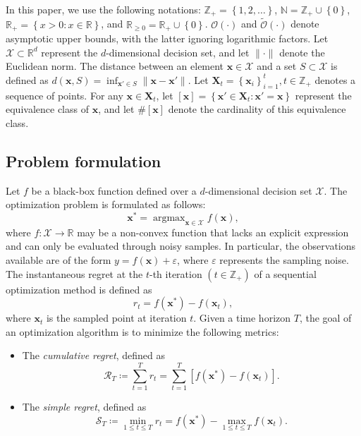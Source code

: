 \documentclass[11pt,en]{elegantpaper}
\newcommand{\domain}{\mathcal{X}}
\newcommand{\X}{\bm{X}}
\newcommand{\x}{\bm{x}}
\newcommand{\order}{\mathcal{O}}
\newcommand{\cumregret}{\mathcal{R}}
\newcommand{\simregret}{\mathcal{S}}
\newcommand{\1}{\mathds{1}}
\newcommand{\set}[1]{\left\{#1\right\}}
\DeclareMathOperator*{\argmax}{argmax}
\begin{document}
In this paper, we use the following notations: $\mathbb{Z}_{+} = \set{1, 2, \dots}$, $\mathbb{N} = \mathbb{Z}_{+} \cup \set{0}$, $\mathbb{R}_+ = \set{x > 0 : x \in \mathbb{R}}$, and $\mathbb{R}_{\ge 0} = \mathbb{R}_+ \cup \set{0}$.
$\order(\cdot)$ and $\widetilde{\order}(\cdot)$ denote asymptotic upper bounds, with the latter ignoring logarithmic factors.
Let $\domain \subset \mathbb{R}^d$ represent the $d$-dimensional decision set, and let $\|\cdot\|$ denote the Euclidean norm. The distance between an element $\x \in \domain$ and a set $S \subset \domain$ is defined as $d(\x, S) = \inf_{\x' \in S} \|\x - \x'\|$. Let $\X_t = \set{\x_i}_{i=1}^{t}, t\in \mathbb{Z}_+$ denotes a sequence of points. For any $\x \in \X_t$, let $[\x] = \set{\x' \in \X_t : \x' = \x}$ represent the equivalence class of $\x$, and let $\#[\x]$ denote the cardinality of this equivalence class.




\subsection{Problem formulation}

Let $f$ be a black-box function defined over a $d$-dimensional decision set $\domain$. The optimization problem is formulated as follows:
\begin{equation}
    \x^{\ast} = \argmax_{\x \in \domain} f(\x),
\end{equation}
where $f: \domain \to \mathbb{R}$ may be a non-convex function that lacks an explicit expression and can only be evaluated through noisy samples. In particular, the observations available are of the form $y = f(\x) + \varepsilon$, where $\varepsilon$ represents the sampling noise.
The instantaneous regret at the $t$-th iteration $(t \in \mathbb{Z}_+)$ of a sequential optimization method is defined as
\begin{equation}
    r_t = f(\x^\ast) - f(\x_t),
\end{equation}
where $\x_t$ is the sampled point at iteration $t$.
Given a time horizon $T$, the goal of an optimization algorithm is to minimize the following metrics:
\begin{itemize}
    \item The \textit{cumulative regret}, defined as
        \begin{equation}
            \cumregret_T \coloneqq \sum_{t=1}^{T} r_t = \sum_{t=1}^{T} \left[f(\x^\ast) - f(\x_t)\right].
        \end{equation}
    \item The \textit{simple regret}, defined as
        \begin{equation}
            \simregret_T \coloneqq \min_{1 \leq t \leq T} r_t = f(\x^\ast) - \max_{1 \leq t \leq T} f(\x_t).
        \end{equation}
\end{itemize}
\end{document}
